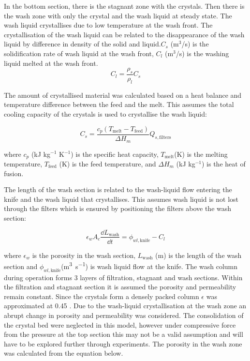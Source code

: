 In the bottom section, there is the stagnant zone with the crystals. Then there is the wash zone with only the crystal and the wash liquid at steady state. The wash liquid crystallises due to low temperature at the wash front. The crystallisation of the wash liquid can be related to the disappearance of the wash liquid by difference in density of the solid and liquid.$C_s$ (m$^3$/s) is the solidification rate of wash liquid at the wash front, $C_l$ (m$^3$/s) is the washing liquid melted at the wash front. 
\begin{equation}
C_l= \frac{\rho_s}{\rho_l}C_s
\end{equation}

The amount of crystallised material was calculated based on a heat balance and temperature difference between the feed and the melt. This assumes the total cooling capacity of the crystals is used to crystallise the wash liquid:

\begin{equation}
C_s= \frac{c_p(T_{\mathrm{melt}}-T_{\mathrm{feed}})}{\Delta H_m}Q_{s,\mathrm{filters}}
\end{equation}

\noindent where $c_p$ (kJ kg$^{-1}$ K$^{-1}$) is the specific heat capacity, $T_{\mathrm{melt}} $(K) is the melting temperature, $T_{\mathrm{feed}}$ (K) is the feed temperature, and $\Delta H_m$ (kJ kg$^{-1}$) is the heat of fusion. 

The length of the wash section is related to the wash-liquid flow entering the knife and the wash liquid that crystallises. This assumes wash liquid is not lost through the filters which is ensured by positioning the filters above the wash section:

\begin{equation}
\epsilon_w A_c \frac{\dd L_{\mathrm{wash}}}{\dd t}= \phi_{wl,\mathrm{knife}}-C_l
\end{equation}

\noindent where $\epsilon_w$ is the porosity in the wash section, $L_{\mathrm{wash}}$ (m) is the length of the wash section and $\phi_{wl,\mathrm{knife}} $(\si{\cubic\m\per\s}) is wash liquid flow at the knife. 
The wash column during operation forms 3 layers of filtration, stagnant and wash sections. Within the filtration and stagnant section it is assumed the porosity and permeability remain constant. Since the crystals form a densely packed column $\epsilon$ was approximated at 0.45 \cite{jansens_furification_1995}. Due to the wash-liquid crystallisation at the wash zone an abrupt change in porosity and permeability was considered. The consolidation of the crystal bed were neglected in this model, however under compressive force from the pressure at the top section this may not be a valid assumption and will have to be explored further through experiments. The porosity in the wash zone was calculated from the equation below. 

